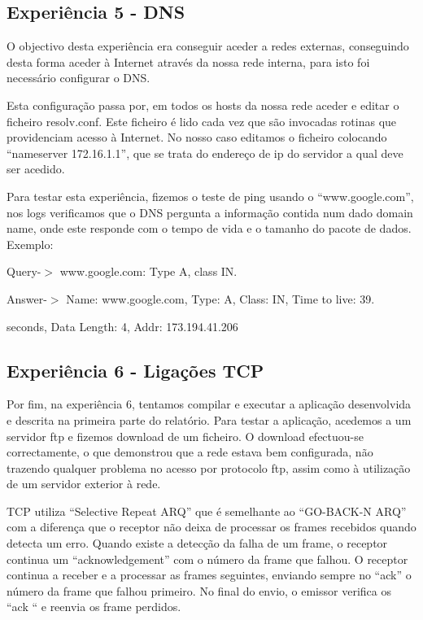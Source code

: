 \documentclass[a4paper]{article}
\begin{document}
\subsection{Experiência 5 - DNS}
O objectivo desta experiência era conseguir aceder a redes externas, conseguindo desta forma aceder à Internet através da nossa rede interna, para isto foi necessário configurar o DNS. 

Esta configuração passa por, em todos os hosts da nossa rede aceder e editar o ficheiro resolv.conf. Este ficheiro é lido cada vez que são invocadas rotinas que providenciam acesso à Internet. No nosso caso editamos o ficheiro colocando “nameserver 172.16.1.1”, que se trata do endereço de ip do servidor a qual deve ser acedido.	


Para testar esta experiência, fizemos o teste de ping usando o “www.google.com”, nos logs verificamos que o DNS pergunta a informação contida num dado domain name, onde este responde com o tempo de vida e o tamanho do pacote de dados.\linebreak
Exemplo:

Query-$>$ www.google.com: Type A, class IN.

Answer-$>$ Name: www.google.com, Type: A, Class: IN, Time to live: 39.

seconds, Data Length: 4, Addr: 173.194.41.206

\subsection{Experiência 6 - Ligações TCP}
Por fim, na experiência 6, tentamos compilar e executar a aplicação desenvolvida e descrita na primeira parte do relatório.
	Para testar a aplicação, acedemos a um servidor ftp e fizemos download de um ficheiro. O download efectuou-se correctamente, o que demonstrou que a rede estava bem configurada, não trazendo qualquer problema no acesso por protocolo ftp, assim como à utilização de um servidor exterior à rede.

	TCP utiliza “Selective Repeat ARQ” que é semelhante ao “GO-BACK-N ARQ” com a diferença que o receptor não deixa de processar os frames recebidos quando detecta um erro. Quando existe a detecção da falha de um frame, o receptor continua um “acknowledgement” com o número da frame que falhou. O receptor continua a receber e a processar as frames seguintes, enviando sempre no “ack” o número da frame que falhou primeiro. No final do envio, o emissor verifica os “ack “ e reenvia os frame perdidos.
\end{document}
